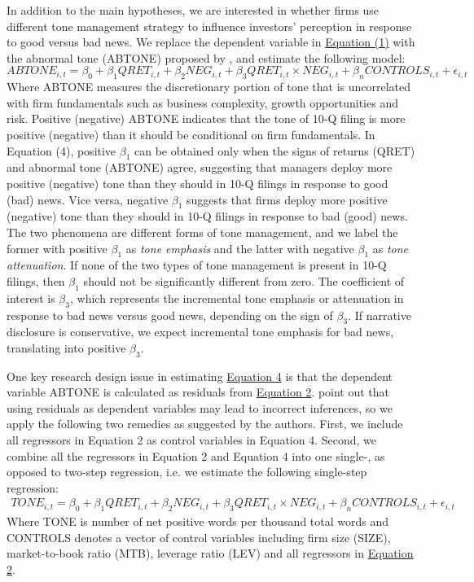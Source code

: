 \documentclass[a4paper]{article}
\begin{document}
\begin{spacing}{2}
In addition to the main hypotheses, we are interested in whether firms use different tone management strategy to influence investors' perception in response to good versus bad news. We replace the dependent variable in \hyperref[eq1]{Equation (1)} with the abnormal tone (ABTONE) proposed by , and estimate the following model:
\begin{equation} \label{eq4}
ABTONE_{i,t}=\beta_0+\beta_1QRET_{i,t}+\beta_2NEG_{i,t}+\beta_3QRET_{i,t}\times NEG_{i,t}+\beta_nCONTROLS_{i,t}+\epsilon_{i,t}
\end{equation}
Where ABTONE measures the discretionary portion of tone that is uncorrelated with firm fundamentals such as business complexity, growth opportunities and risk. Positive (negative) ABTONE indicates that the tone of 10-Q filing is more positive (negative) than it should be conditional on firm fundamentals. In Equation (4), positive $\beta_1$ can be obtained only when the signs of returns (QRET) and abnormal tone (ABTONE) agree, suggesting that managers deploy more positive (negative) tone than they should in 10-Q filings in response to good (bad) news. Vice versa, negative $\beta_1$ suggests that firms deploy more positive (negative) tone than they should in 10-Q filings in response to bad (good) news. The two phenomena are different forms of tone management, and we label the former with positive $\beta_1$ as \textit{tone emphasis} and the latter with negative $\beta_1$ as \textit{tone attenuation}. If none of the two types of tone management is present in 10-Q filings, then $\beta_1$ should not be significantly different from zero. The coefficient of interest is $\beta_3$, which represents the incremental tone emphasis or attenuation in response to bad news versus good news, depending on the sign of $\beta_3$. If narrative disclosure is conservative, we expect incremental tone emphasis for bad news, translating into positive $\beta_3$.

One key research design issue in estimating \hyperref[eq4]{Equation 4} is that the dependent variable ABTONE is calculated as residuals from \hyperref[eq2]{Equation 2}.  point out that using residuals as dependent variables may lead to incorrect inferences, so we apply the following two remedies as suggested by the authors. First, we include all regressors in Equation 2 as control variables in Equation 4. Second, we combine all the regressors in Equation 2 and Equation 4 into one single-, as opposed to two-step regression, i.e. we estimate the following single-step regression:
\begin{equation} \label{eq5}
\begin{split}
TONE_{i,t}=\beta_0+\beta_1QRET_{i,t}+\beta_2NEG_{i,t}+\beta_3QRET_{i,t}\times NEG_{i,t}+\beta_nCONTROLS_{i,t}+\epsilon_{i,t}
\end{split}
\end{equation}
Where TONE is number of net positive words per thousand total words and CONTROLS denotes a vector of control variables including firm size (SIZE), market-to-book ratio (MTB), leverage ratio (LEV) and all regressors in \hyperref[eq2]{Equation 2}.


\end{spacing}
\end{document}
